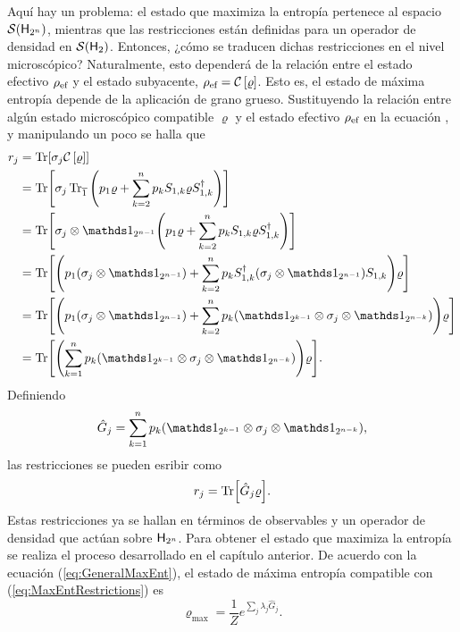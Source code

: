Aquí hay un problema: el estado que maximiza la entropía pertenece al espacio $\mathcal{S}({\sf H}_{2^{n}})$, mientras que las restricciones están definidas para un operador de densidad en $\mathcal{S}({\sf H}_{2})$. Entonces, ¿cómo se traducen dichas restricciones en el nivel microscópico? Naturalmente, esto dependerá de la relación entre el estado efectivo $\rho_{\text{ef}}$ y el estado subyacente, $\rho_{\text{ef}}=\mathcal{C}\left[\varrho\right]$. Esto es, el estado de máxima entropía depende de la aplicación de grano grueso. Sustituyendo la relación entre algún estado microscópico compatible $\varrho$ y el estado efectivo $\rho_{\text{ef}}$ en la ecuación \label{eq:Restrictions}, y manipulando un poco se halla que
\begin{align}
    r_{j}&=\Tr[\sigma_{j}\CG{\varrho}]\nonumber\\
    &=\Tr[\sigma_{j}\Tr_{\overline{1}}\qty(p_{1}\varrho+\sum_{k=2}^{n}p_{k}S_{1,k}\varrho S_{1,k}^{\dagger})]\nonumber\\
    &=\Tr[\sigma_{j}\otimes\Id_{2^{n-1}}\qty(p_{1}\varrho+\sum_{k=2}^{n}p_{k}S_{1,k}\varrho S_{1,k}^{\dagger})]\nonumber\\
    &=\Tr[\qty(p_{1}(\sigma_{j}\otimes\Id_{2^{n-1}})+\sum_{k=2}^{n}p_{k}S_{1,k}^{\dagger}(\sigma_{j}\otimes\Id_{2^{n-1}})S_{1,k})\varrho]\nonumber\\
    &=\Tr[\qty(p_{1}(\sigma_{j}\otimes\Id_{2^{n-1}})+\sum_{k=2}^{n}p_{k}(\Id_{2^{k-1}}\otimes\sigma_{j}\otimes\Id_{2^{n-k}}))\varrho]\nonumber\\
    &=\Tr[\qty(\sum_{k=1}^{n}p_{k}(\Id_{2^{k-1}}\otimes\sigma_{j}\otimes\Id_{2^{n-k}}))\varrho]\nonumber.
\end{align}
Definiendo
\begin{equation}\label{eq:GhatNM}
    \hat{G}_{j}=\sum_{k=1}^{n}p_{k}(\Id_{2^{k-1}}\otimes\sigma_{j}\otimes\Id_{2^{n-k}}),
\end{equation}
las restricciones se pueden esribir como
\begin{equation}\label{eq:MaxEntRestrictions}
    r_{j}=\Tr[\hat{G}_{j}\varrho].
\end{equation}
Estas restricciones ya se hallan en términos de observables y un operador de densidad que actúan sobre ${\sf H}_{2^{n}}$. Para obtener el estado que maximiza la entropía se realiza el proceso desarrollado en el capítulo anterior. De acuerdo con la ecuación (\ref{eq:GeneralMaxEnt}), el estado de máxima entropía compatible con (\ref{eq:MaxEntRestrictions}) es
\begin{equation}\label{eq:MaxEntLagMult}
    \varrho_{\max}=\frac{1}{Z}e^{\sum_{j}\lambda_{j}\hat{G}_{j}}.
\end{equation}
